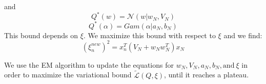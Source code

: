 and 
$$Q ^ *(w)=\mathcal{N}(w | w_N, V_N)$$ 
$$Q^ *(\alpha)=Gam(\alpha | a_N, b_N)$$
This bound depends on $\xi$. We maximize this bound with respect to $\xi$ and we find: 
\begin{equation}
(\xi_n^{new})^2=x_n^T (V_N +w_Nw_N ^T) x_N
\end{equation}


We use the EM algorithm to update the equations for $ w_N , V_N, a_N, b_N, \text{and}~ \xi $ in order to maximize the variational bound $\mathcal{\tilde{L}}(Q, \xi)$, until it reaches a plateau. 


